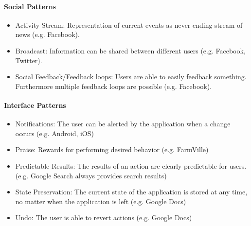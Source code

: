 \paragraph*{Social Patterns}
\begin{itemize}
	\item Activity Stream: Representation of current events as never ending stream of news (e.g. Facebook). \cite[p. 4, 52]{lewisIrresistibleAppsMotivational2014}
	\item Broadcast: Information can be shared between different users (e.g. Facebook, Twitter). \cite[p. 4, 53]{lewisIrresistibleAppsMotivational2014}
	\item Social Feedback/Feedback loops: Users are able to easily feedback something. Furthermore multiple feedback loops are possible (e.g. Facebook).
	\cite[p. 4, 54]{lewisIrresistibleAppsMotivational2014}
\end{itemize}

\paragraph*{Interface Patterns}
\begin{itemize}
	\item Notifications: The user can be alerted by the application when a change occurs (e.g. Android, iOS) 	\cite[p. 5, 70]{lewisIrresistibleAppsMotivational2014}
	\item Praise: Rewards for performing desired behavior (e.g. FarmVille) \cite[p. 5, 72]{lewisIrresistibleAppsMotivational2014}
	\item Predictable Results: The results of an action are clearly predictable for users. (e.g. Google Search always provides search results) \cite[p. 5, 74]{lewisIrresistibleAppsMotivational2014}
	\item State Preservation: The current state of the application is stored at any time, no matter when the application is left (e.g. Google Docs) \cite[p. 5, 75, 76]{lewisIrresistibleAppsMotivational2014}
	\item Undo: The user is able to revert actions (e.g. Google Docs) \cite[p. 5, 79]{lewisIrresistibleAppsMotivational2014}
\end{itemize}

